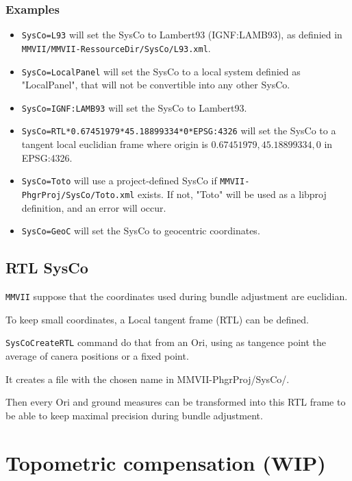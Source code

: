 \subsection{Examples}
\begin{itemize}
\item {\tt SysCo=L93} will set the SysCo to Lambert93 (IGNF:LAMB93), as definied in \\
{\tt MMVII/MMVII-RessourceDir/SysCo/L93.xml}.
\item {\tt SysCo=LocalPanel} will set the SysCo to a local system definied as "LocalPanel", that will not be convertible into any other SysCo.
\item {\tt SysCo=IGNF:LAMB93} will set the SysCo to Lambert93.
\item {\tt SysCo=RTL*0.67451979*45.18899334*0*EPSG:4326} will set the SysCo to a tangent local euclidian frame where origin is $0.67451979, 45.18899334, 0$ in EPSG:4326.
\item {\tt SysCo=Toto} will use a project-defined SysCo if {\tt MMVII-PhgrProj/SysCo/Toto.xml} exists. If not, "Toto" will be used as a libproj definition, and an error will occur.
\item {\tt SysCo=GeoC} will set the SysCo to geocentric coordinates.

\end{itemize}


\section{RTL SysCo}
\label{SysCoRTL}
{\tt MMVII} suppose that the coordinates used during bundle adjustment are euclidian.

To keep small coordinates, a Local tangent frame (RTL) can be defined.

{\tt SysCoCreateRTL} command do that from an Ori, using as tangence point the average of canera positions or a fixed point.

It creates a file with the chosen name in {MMVII-PhgrProj/SysCo/}.

Then every Ori and ground measures can be transformed into this RTL frame to be able to keep maximal precision during bundle adjustment.




\chapter{Topometric compensation (WIP)}
\label{Chap:TopoUser}


